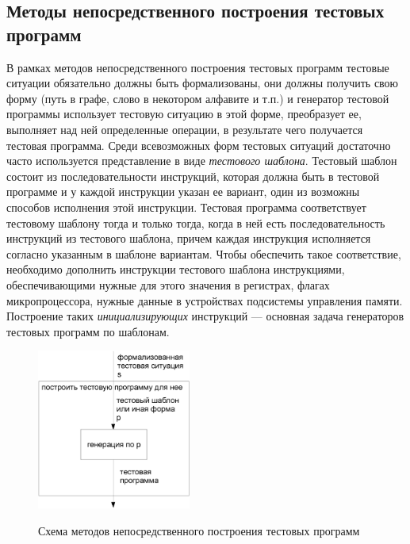 \subsection{Методы непосредственного построения тестовых программ}

В рамках методов непосредственного построения тестовых программ тестовые ситуации обязательно должны быть формализованы, они должны получить свою форму (путь в графе, слово в некотором алфавите и т.п.) и генератор тестовой программы использует тестовую ситуацию в этой форме, преобразует ее, выполняет над ней определенные операции, в результате чего получается тестовая программа. Среди всевозможных форм тестовых ситуаций достаточно часто используется представление в виде \emph{тестового шаблона}. Тестовый шаблон состоит из последовательности инструкций, которая должна быть в тестовой программе и у каждой инструкции указан ее вариант, один из возможны способов исполнения этой инструкции. Тестовая программа соответствует тестовому шаблону тогда и только тогда, когда в ней  есть последовательность инструкций из тестового шаблона, причем каждая инструкция исполняется согласно указанным в шаблоне вариантам. Чтобы обеспечить такое соответствие, необходимо дополнить инструкции тестового шаблона инструкциями, обеспечивающими нужные для этого значения в регистрах, флагах микропроцессора, нужные данные в устройствах подсистемы управления памяти. Построение таких \emph{инициализирующих} инструкций --- основная задача генераторов тестовых программ по шаблонам.

\begin{figure}[h] \center
  \includegraphics[width=0.45\textwidth]{1.review/im_methods}\\
  \caption{Схема методов непосредственного построения тестовых программ}\label{fig:immediate_methods}
\end{figure}

